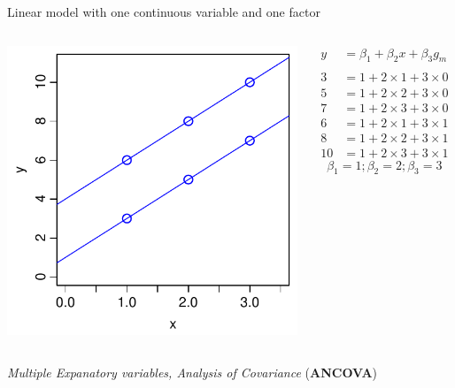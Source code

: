 \documentclass[xcolor=x11names,handout,compress]{beamer}
\renewcommand{\(}{\begin{columns}}
\renewcommand{\)}{\end{columns}}
\newcommand{\<}[1]{\begin{column}{#1}}
\renewcommand{\>}{\end{column}}
\begin{document}
\begin{frame}{Linear model with one continuous variable and one factor}

    \begin{columns}[T]
    
            \includegraphics[width=\textwidth]{TwoVars.pdf}
            
            \begin{align*}
              y  &= \beta_1  + \beta_2 x + \beta_3 g_m\\
              \\
              3   &= 1 + 2 \times 1 + 3 \times 0\\
              5   &= 1 + 2 \times 2 + 3 \times 0\\
              7   &= 1 + 2 \times 3 + 3 \times 0\\
              6   &= 1 + 2 \times 1 + 3 \times 1\\  
              8   &= 1 + 2 \times 2 + 3 \times 1\\
              10  &= 1 + 2 \times 3 + 3 \times 1
            \end{align*}
            \[\beta_1 = 1; \beta_2=2; \beta_3=3\]
    \end{columns}
    \pause
    \begin{center}
        {\it Multiple Expanatory variables, Analysis of Covariance} ({\bf ANCOVA})
    \end{center}
\end{frame}
   
\end{document}
